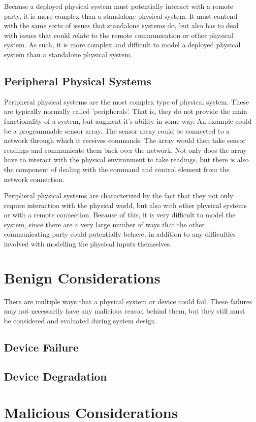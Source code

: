 Because a deployed physical system must potentially interact with a remote party, it is more complex than a standalone physical
system. It must contend with the same sorts of issues that standalone systems do, but also has to deal with issues that could
relate to the remote communication or other physical system.  As such, it is more complex and difficult to model a deployed
physical system than a standalone physical system.

\subsection*{Peripheral Physical Systems}
Peripheral physical systems are the most complex type of physical system. These are typically normally called 'peripherals'. That
is, they do not provide the main functionality of a system, but augment it's ability in some way. An example could be a 
programmable sensor array. The sensor array could be connected to a network through which it receives commands. The array
would then take sensor readings and communicate them back over the network. Not only does the array have to 
interact with the physical environment to take readings, but there is also the component of dealing with the
command and control element from the network connection.

Peripheral physical systems are characterized by the fact that they not only require interaction with the physical world, but
also with other physical systems or with a remote connection. Because of this, it is very difficult to model the system, since
there are a very large number of ways that the other communicating party could potentially behave, in addition to any difficulties
involved with modelling the physical inputs themselves. 




\section{Benign Considerations}
There are multiple ways that a physical system or device could fail. These failures may not necessarily have
any malicious reason behind them, but they still must be considered and evaluated during system design.


\subsection{Device Failure}

\subsection{Device Degradation}

\section{Malicious Considerations}

